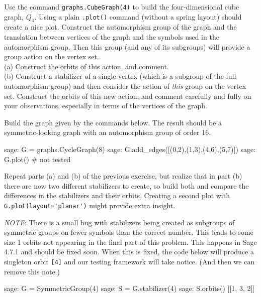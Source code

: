 %
%
Use the command \verb?graphs.CubeGraph(4)? to build the four-dimensional cube graph, $Q_4$.  Using a plain \verb?.plot()? command (without a spring layout) should create a nice plot.  Construct the automorphism group of the graph and the translation between vertices of the graph and the symbols used in the automorphism group.  Then this group (and any of its subgroups) will provide a group action on the vertex set.\\
%
(a) Construct the orbits of this action, and comment.\\
(b) Construct a stabilizer of a single vertex (which is a subgroup of the full automorphism group) and then consider the action of \emph{this} group on the vertex set.  Construct the orbits of this new action, and comment carefully and fully on your observations, especially in terms of the vertices of the graph.
\begin{sageverbatim}\end{sageverbatim}
%
%
Build the graph given by the commands below.  The result should be a symmetric-looking graph with an automorphism group of order 16.
%
%
\begin{sageexample}
sage: G = graphs.CycleGraph(8)
sage: G.add_edges([(0,2),(1,3),(4,6),(5,7)])
sage: G.plot()                  # not tested
\end{sageexample}
%
Repeat parts (a) and (b) of the previous exercise, but realize that in part (b) there are now two different stabilizers to create, so build both and compare the differences in the stabilizers and their orbits.  Creating a second plot with \verb?G.plot(layout='planar')? might provide extra insight.\par
%
\emph{NOTE}: There is a small bug with stabilizers being created as subgroups of symmetric groups on fewer symbols than the correct number.  This leads to some size 1 orbits not appearing in the final part of this problem.  This happens in Sage 4.7.1 and should be fixed soon.  When this is fixed, the code below will produce a singleton orbit \texttt{[4]} and our testing framework will take notice.  (And then we can remove this note.)
%
\begin{sageexample}
sage: G = SymmetricGroup(4)
sage: S = G.stabilizer(4)
sage: S.orbits()
[[1, 3, 2]]
\end{sageexample}
%

